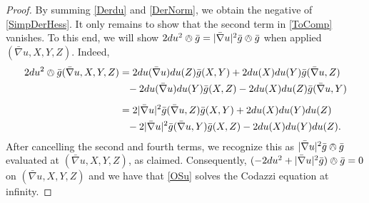 \documentclass{amsart}
\numberwithin{equation}{section}
\begin{document}
\begin{proof}
By summing \eqref{Derdu} and \eqref{DerNorm}, we obtain the negative of \eqref{SimpDerHess}.
It only remains to show that the second term in \eqref{ToComp} vanishes. 
To this end, we will show $2du^2\owedge\bar{g} = |\bar{\nabla}u|^2\bar{g}\owedge \bar{g}$ when applied $(\bar{\nabla}u,X,Y,Z)$.
Indeed,
\begin{align*}
2du^2\owedge\bar{g}(\bar{\nabla}u,X,Y,Z)
&= 2du(\bar{\nabla}u)du(Z)\bar{g}(X,Y) + 2du(X)du(Y)\bar{g}(\bar{\nabla}u,Z) \\
&\phantom{=} - 2du(\bar{\nabla}u)du(Y)\bar{g}(X,Z) - 2du(X)du(Z)\bar{g}(\bar{\nabla}u,Y) \\[5pt]
&= 2|\bar{\nabla}u|^2\bar{g}(\bar{\nabla}u,Z)\bar{g}(X,Y) + 2du(X)du(Y)du(Z) \\
&\phantom{=} - 2|\bar{\nabla}u|^2\bar{g}(\bar{\nabla}u,Y)\bar{g}(X,Z) -2du(X)du(Y)du(Z).
\end{align*}
After cancelling the second and fourth terms, we recognize this as $|\bar{\nabla}u|^2\bar{g}\owedge\bar{g}$ evaluated at $(\bar{\nabla}u,X,Y,Z)$, as claimed.
Consequently, $(- 2 du^2 + |\bar{\nabla}u|^2 \bar{g})\owedge \bar{g} = 0$ on $(\bar{\nabla}u,X,Y,Z)$ and we have that \eqref{OSu} solves the Codazzi equation at infinity. 



\end{proof}
\end{document}
